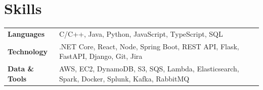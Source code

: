 \section{Skills}

\small
\begin{tabular}{ll}
\textbf{Languages} & \hspace{0.5cm} C/C++, Java, Python, JavaScript, TypeScript, SQL \\

\textbf{Technology} & \hspace{0.5cm} .NET Core, React, Node, Spring Boot, REST API, Flask, FastAPI, Django, Git, Jira \\

\textbf{Data \& Tools} & \hspace{0.5cm} AWS, EC2, DynamoDB, S3, SQS, Lambda, Elasticsearch, Spark, Docker, Splunk, Kafka, RabbitMQ \\
\end{tabular}